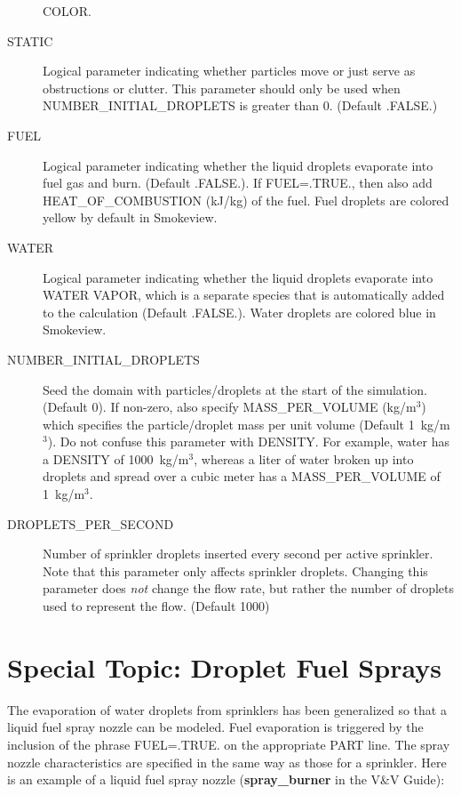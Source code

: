 \documentclass[11pt]{book}
\begin{document}
\begin{description}
{\ct COLOR}.
\item[{\ct STATIC}] Logical parameter indicating whether particles move or just serve
as obstructions or clutter. This parameter should only be used when
{\ct NUMBER\_INITIAL\_DROPLETS} is greater than 0. (Default {\ct .FALSE.})
\item[{\ct FUEL}] Logical parameter indicating whether the liquid droplets evaporate
into fuel gas and burn. (Default {\ct .FALSE.}). If {\ct FUEL=.TRUE.},
then also add {\ct HEAT\_OF\_COMBUSTION} (kJ/kg) of the fuel. Fuel droplets are colored yellow by default in Smokeview.
\item[{\ct WATER}] Logical parameter indicating whether the liquid droplets evaporate
into {\ct WATER VAPOR}, which is a separate species that is automatically added to the calculation (Default {\ct .FALSE.}).
Water droplets are colored blue in Smokeview.
\item[{\ct NUMBER\_INITIAL\_DROPLETS}]
Seed the domain with particles/droplets at the start of the simulation.
(Default 0). If non-zero, also specify {\ct MASS\_PER\_VOLUME} (kg/m$^3$) which
specifies the particle/droplet mass per unit volume (Default 1~kg/m$^3$). Do
not confuse this parameter with {\ct DENSITY}. For example, water has a
{\ct DENSITY} of 1000~kg/m$^3$, whereas a liter of water broken up into droplets
and spread over a cubic meter has a {\ct MASS\_PER\_VOLUME} of 1~kg/m$^3$.
\item[{\ct DROPLETS\_PER\_SECOND}]  Number of sprinkler droplets inserted every
second per active sprinkler. Note that this parameter only affects sprinkler
droplets. Changing this parameter does {\em not} change the flow rate, but rather the number
of droplets used to represent the flow. (Default 1000)
\end{description}







\section{Special Topic: Droplet Fuel Sprays}

The evaporation of water droplets from sprinklers has been
generalized so that a liquid fuel spray
nozzle can be modeled. Fuel evaporation is triggered by the inclusion of the
phrase {\ct FUEL=.TRUE.} on the appropriate {\ct PART} line.
The spray nozzle characteristics are specified
in the same way as those for a sprinkler. Here is an example of a liquid fuel spray nozzle ({\bf spray\_burner} in the V\&V Guide):
\end{document}
